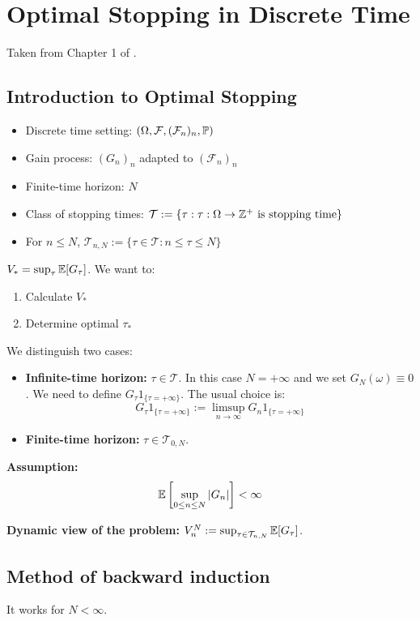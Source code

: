 \section{Optimal Stopping in Discrete Time}

Taken from Chapter 1 of \cite{peskir2006optimal}.

\subsection{Introduction to Optimal Stopping}

\begin{itemize}
    \item Discrete time setting: $(\Omega, \mathcal{F}, (\mathcal{F}_n)_n, \mathbb P)$
    \item Gain process: $(G_n)_n$ adapted to $(\mathcal{F}_n)_n$
    \item Finite-time horizon: $N$
    \item Class of stopping times: $\mathcal{T} := \{\tau : \tau : \Omega \to \mathbb Z^+ \text{ is stopping time}\}$
    \item For $n \le N$, $\mathcal{T}_{n,N} := \{\tau \in \mathcal{T} : n \le \tau \le N\}$
\end{itemize}

 $V_* = \sup_{\tau} \mathbb E[G_\tau]$.
We want to:
\begin{enumerate}
    \item Calculate $V_*$
    \item Determine optimal $\tau_*$
\end{enumerate}

We distinguish two cases:
\begin{itemize}
    \item \textbf{Infinite-time horizon:} $\tau \in \mathcal{T}$. In this case $N = +\infty$ and we set $G_N(\omega) \equiv 0$. We need to define $G_\tau 1_{\{\tau = +\infty\}}$. The usual choice is:
    $$G_\tau 1_{\{\tau = +\infty\}} := \limsup_{n \to \infty} G_n 1_{\{\tau = +\infty\}}$$
    \item \textbf{Finite-time horizon:} $\tau \in \mathcal{T}_{0,N}$.
\end{itemize}


\textbf{Assumption:}
$$\mathbb E\left[ \sup_{0 \le n \le N} |G_n| \right] < \infty$$


\textbf{Dynamic view of the problem:} $V_n^N := \sup_{\tau \in \mathcal{T}_{n,N}} \mathbb E[G_\tau]$.

\subsection{Method of backward induction}
It works for $N < \infty$.

